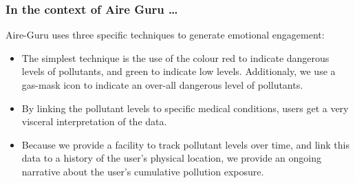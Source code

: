 \subsubsection*{In the context of Aire Guru \ldots}

Aire-Guru uses three specific techniques to generate emotional engagement:

\begin{itemize}

    \item The simplest technique is the use of the colour red to indicate dangerous levels of pollutants, and green to indicate low levels.
    Additionaly, we use a gas-mask icon to indicate an over-all dangerous level of pollutants.

    \item By linking the pollutant levels to specific medical conditions, users get a very visceral interpretation of the data.
    
    \item Because we provide a facility to track pollutant levels over time, and link this data to a history of the user's physical location, we provide
    an ongoing narrative about the user's cumulative pollution exposure.

\end{itemize}